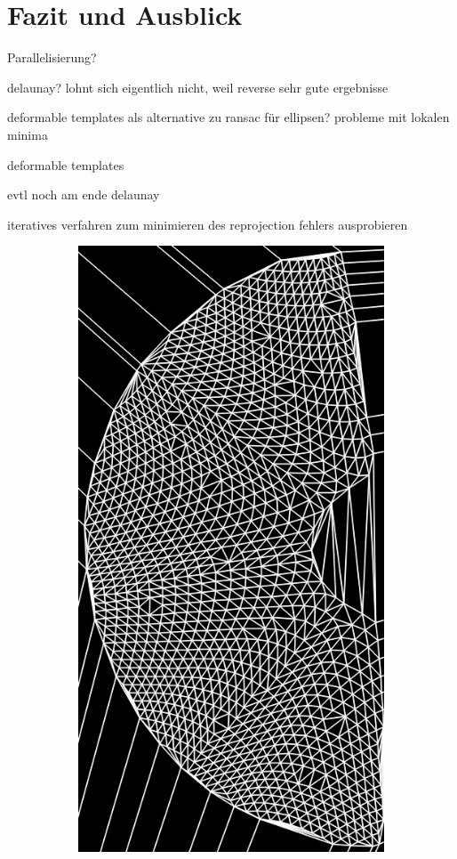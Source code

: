 \chapter{Fazit und Ausblick}
Parallelisierung?

delaunay? lohnt sich eigentlich nicht, weil reverse sehr gute ergebnisse

deformable templates als alternative zu ransac für ellipsen?  probleme mit lokalen minima



deformable templates

evtl noch am ende delaunay

iteratives verfahren zum minimieren des reprojection fehlers ausprobieren



\begin{figure}[!htb]
	\centering
	\begin{subfigure}{.9\textwidth}
		\centering
		\includegraphics[angle=-90, width=.8\textwidth]{images/delaunay1.png}

\end{subfigure}
\end{figure}
